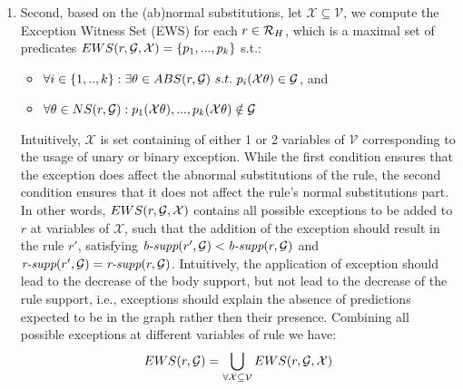 \begin{enumerate}
\item Second, based on the (ab)normal substitutions, let $\mathcal{X} \subseteq \mathcal{V}$, we compute the Exception Witness Set (EWS) for each $r \in \mathcal{R}_H$, which is a maximal set of predicates $EWS(r,\mathcal{G},\mathcal{X}) = \{p_1,...,p_k\}$ s.t.:
\begin{itemize}
\item $\forall i \in \{1,..,k\} : \exists \theta \in ABS(r, \mathcal{G})\ s.t.\ p_i(\mathcal{X}\theta) \in \mathcal{G}$, and 
\item $\forall \theta \in NS(r,\mathcal{G}) :  p_1(\mathcal{X}\theta), ...,p_k(\mathcal{X}\theta) \notin \mathcal{G}$
\end{itemize}
Intuitively, $\mathcal{X}$ is set containing of either 1 or 2 variables of $\mathcal{V}$ corresponding to the usage of unary or binary exception. While the first condition ensures that the exception does affect the abnormal substitutions of the rule, the second condition ensures that it does not affect the rule's normal substitutions part. In other words, $EWS(r,\mathcal{G},\mathcal{X})$ contains all possible exceptions to be added to $r$ at variables of $\mathcal{X}$, such that the addition of the exception should result in the rule $r'$, satisfying $\textit{b-supp}(r', \mathcal{G}) < \textit{b-supp}(r, \mathcal{G})$ and $\textit{r-supp}(r', \mathcal{G}) = \textit{r-supp}(r, \mathcal{G})$. Intuitively, the application of exception should lead to the decrease of the body support, but not lead to the decrease of
the rule support, i.e., exceptions should explain the absence of predictions expected to be in the graph rather then their presence.
Combining all possible exceptions at different variables of rule we have:
\[EWS(r,\mathcal{G}) = \bigcup_{\forall\mathcal{X}\subseteq \mathcal{V}}EWS(r,\mathcal{G},\mathcal{X})\]


\end{enumerate}
